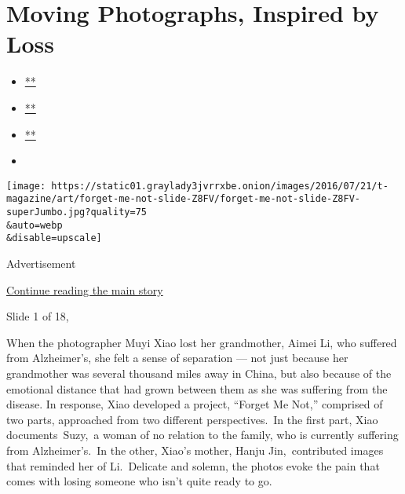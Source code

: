 \hypertarget{moving-photographs-inspired-by-loss}{%
\section{Moving Photographs, Inspired by
Loss}\label{moving-photographs-inspired-by-loss}}

\begin{itemize}
\item
  \href{https://www.facebookcorewwwi.onion/sharer.php?app_id=9869919170\&u=https\%3A\%2F\%2Fwww.nytimes3xbfgragh.onion\%2Fslideshow\%2F2016\%2F07\%2F21\%2Ft-magazine\%2Fart\%2Fmuyi-xiao-photographer-alzheimers.html\%3Fsmid\%3Dfb-share\&name=Moving\%20Photographs\%2C\%20Inspired\%20by\%20Loss\&redirect_uri=https\%3A\%2F\%2Fwww.facebookcorewwwi.onion\%2F}{**}
\item
  \href{https://twitter.com/intent/tweet?url=https\%3A\%2F\%2Fwww.nytimes3xbfgragh.onion\%2Fslideshow\%2F2016\%2F07\%2F21\%2Ft-magazine\%2Fart\%2Fmuyi-xiao-photographer-alzheimers.html\%3Fsmid\%3Dtw-share\&text=Moving\%20Photographs\%2C\%20Inspired\%20by\%20Loss}{**}
\item
  \href{mailto:?subject=nytimes3xbfgragh.onion\%3A\%20Moving\%20Photographs\%2C\%20Inspired\%20by\%20Loss\&body=From\%20The\%20New\%20York\%20Times\%3A\%0A\%0AMoving\%20Photographs\%2C\%20Inspired\%20by\%20Loss\%0A\%0AThe\%20photographer\%20Muyi\%20Xiao\%20began\%20to\%20work\%20on\%20her\%20delicate\%20series\%20\%E2\%80\%9CForget\%20Me\%20Not\%E2\%80\%9D\%20with\%20her\%20mother\%2C\%20after\%20the\%20death\%20of\%20her\%20grandmother.\%0A\%0Ahttps\%3A\%2F\%2Fwww.nytimes3xbfgragh.onion\%2Fslideshow\%2F2016\%2F07\%2F21\%2Ft-magazine\%2Fart\%2Fmuyi-xiao-photographer-alzheimers.html\%3Fsmid\%3Dem-share}{**}
\item
\end{itemize}

\texttt{[image: https://static01.graylady3jvrrxbe.onion/images/2016/07/21/t-magazine/art/forget-me-not-slide-Z8FV/forget-me-not-slide-Z8FV-superJumbo.jpg?quality=75\\\&auto=webp\\\&disable=upscale]}

Advertisement

\protect\hyperlink{after-right-0}{Continue reading the main story}

Slide 1 of 18,

When the photographer Muyi Xiao lost her grandmother, Aimei Li, who
suffered from Alzheimer's, she felt a sense of separation --- not just
because her grandmother was several thousand miles away in China, but
also because of the emotional distance that had grown between them as
she was suffering from the disease. In response, Xiao developed a
project, ``Forget Me Not,'' comprised of two parts, approached from two
different perspectives.~In the first part, Xiao documents~Suzy,~a woman
of no relation to the family, who is currently suffering from
Alzheimer's.~In the other, Xiao's mother, Hanju Jin,~contributed images
that reminded her of Li.~Delicate and solemn, the photos evoke the pain
that comes with losing someone who isn't quite ready to go.

